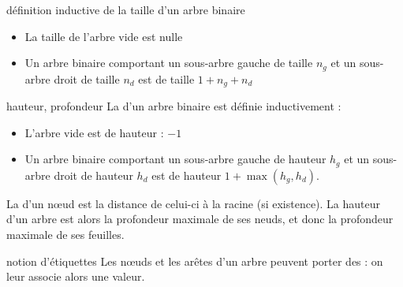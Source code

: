 \begin{remarque}{7.4}{définition inductive de la taille d'un arbre binaire}
    \begin{itemize}
        \item La taille de l'arbre vide est nulle
        \item Un arbre binaire comportant un sous-arbre gauche de taille $n_g$ et un sous-arbre droit de taille $n_d$ est de taille $1+n_g+n_d$ 
    \end{itemize}
    
\end{remarque}

\begin{definition}{7.5}{hauteur, profondeur}
    La  d'un arbre binaire est définie inductivement : \begin{itemize}
        \item L'arbre vide est de hauteur : $-1$
        \item Un arbre binaire comportant un sous-arbre gauche de hauteur $h_g$ et un sous-arbre droit de hauteur $h_d$ est de hauteur $1+\max(h_g,h_d)$.
    \end{itemize}
    La  d'un nœud est la distance de celui-ci à la racine (si existence). La hauteur d'un arbre est alors la profondeur maximale de ses neuds, et donc la profondeur maximale de ses feuilles.
\end{definition}

\begin{remarque}{7.6}{notion d'étiquettes}
    Les nœuds et les arêtes d'un arbre peuvent porter des  : on leur associe alors une valeur. 
\end{remarque}

